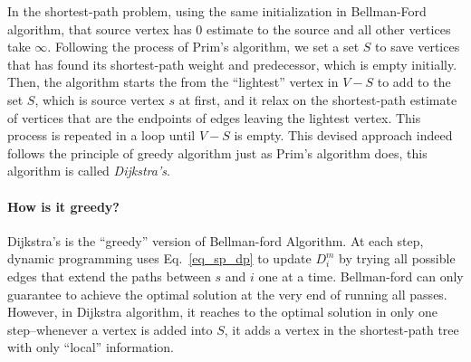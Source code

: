 \documentclass[../main.tex]{subfiles}
\begin{document}
In the shortest-path problem, using the same initialization in Bellman-Ford algorithm, that source vertex has $0$ estimate to the source and all other vertices take $\infty$. Following the process of Prim's algorithm, we set a set $S$ to save vertices that has found its shortest-path weight and predecessor, which is empty initially. Then, the algorithm starts the from the ``lightest'' vertex in $V-S$ to add to the set $S$, which is source vertex $s$ at first, and it relax on the shortest-path estimate of vertices that are the endpoints of edges leaving the lightest vertex. This process is repeated in a loop until $V-S$ is empty. This devised approach indeed follows the principle of greedy algorithm just as Prim's algorithm does, this algorithm is called \textit{Dijkstra's}.

\paragraph{How is it greedy?} Dijkstra's is the ``greedy'' version of Bellman-ford Algorithm. At each step, dynamic programming uses Eq.~\ref{eq_sp_dp} to update $D^{m}_i$ by trying all possible edges that extend the paths between $s$ and $i$ one at a time. Bellman-ford can only guarantee to achieve the optimal solution at the very end of running all passes.  However, in Dijkstra algorithm, it reaches to the optimal solution in only one step--whenever a vertex is added into $S$, it adds a vertex in the shortest-path tree with only ``local'' information. 
\end{document}

